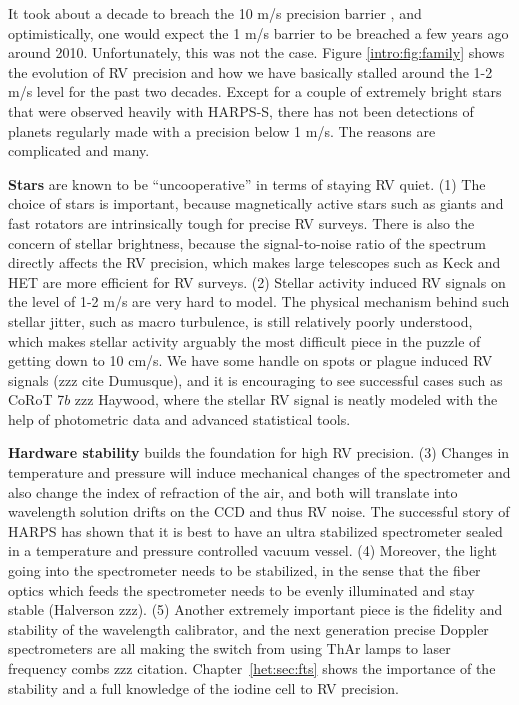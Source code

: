 It took about a decade to breach the 10 m/s precision barrier
\citep{butler1996}, and optimistically, one would expect the 1 m/s
barrier to be breached a few years ago around 2010. Unfortunately,
this was not the case. Figure \ref{intro:fig:family} shows the
evolution of RV precision and how we have basically stalled around the
1-2 m/s level for the past two decades. Except for a couple of
extremely bright stars that were observed heavily with HARPS-S, there
has not been detections of planets regularly made with a precision
below 1 m/s. The reasons are complicated and many.

{\bf Stars} are known to be ``uncooperative'' in terms of staying RV
quiet. (1) The choice of stars is important, because magnetically
active stars such as giants and fast rotators are intrinsically tough
for precise RV surveys. There is also the concern of stellar
brightness, because the signal-to-noise ratio of the spectrum directly
affects the RV precision, which makes large telescopes such as Keck
and HET are more efficient for RV surveys. (2) Stellar activity
induced RV signals on the level of 1-2 m/s are very hard to model. The
physical mechanism behind such stellar jitter, such as macro
turbulence, is still relatively poorly understood, which makes stellar
activity arguably the most difficult piece in the puzzle of getting
down to 10 cm/s. We have some handle on spots or plague induced RV
signals (zzz cite Dumusque), and it is encouraging to see successful
cases such as CoRoT 7$b$ zzz Haywood, where the stellar RV signal is
neatly modeled with the help of photometric data and advanced
statistical tools.

{\bf Hardware stability} builds the foundation for high RV
precision. (3) Changes in temperature and pressure will induce mechanical
changes of the spectrometer and also change the index of refraction of
the air, and both will translate into wavelength solution drifts on
the CCD and thus RV noise. The successful story of HARPS has shown
that it is best to have an ultra stabilized spectrometer sealed in a
temperature and pressure controlled vacuum vessel. (4) Moreover, the light
going into the spectrometer needs to be stabilized, in the sense that
the fiber optics which feeds the spectrometer needs to be evenly
illuminated and stay stable (Halverson zzz). (5) Another extremely
important piece is the fidelity and stability of the wavelength
calibrator, and the next generation precise Doppler spectrometers are
all making the switch from using ThAr lamps to laser frequency combs
zzz citation. Chapter~\ref{het:sec:fts} shows the importance of the
stability and a full knowledge of the iodine cell to RV precision.

